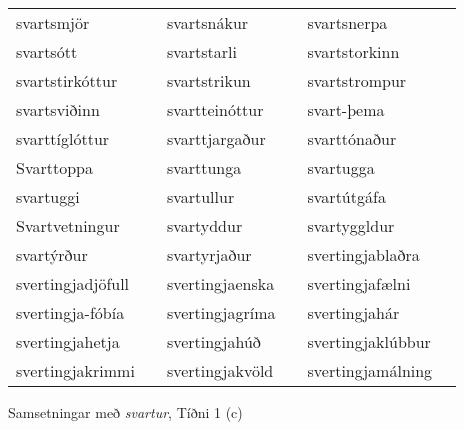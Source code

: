 \documentclass[../samsetningasafn.tex]{subfiles}
\begin{document}
\begin{wordlist}[H]
\begin{tcolorbox}
\begin{tabular}{BlBlBl}
		svartsmjör	&		& 
		svartsnákur	&		& 
		svartsnerpa	&		\\  %
		svartsótt		&		& 
		svartstarli		&		& 
		svartstorkinn	&		\\  %
		svartstirkóttur	&		& 
		svartstrikun	&		& 
		svartstrompur	&		\\  %
		svartsviðinn	&		& 
		svartteinóttur	&		& 
		svart-þema	&		\\  %
		svarttíglóttur	&		& 
		svarttjargaður	&		& 
		svarttónaður	&		\\  %
		Svarttoppa	& 		& 
		svarttunga	&		& 
		svartugga	&		\\  %
		svartuggi		& 		& 
		svartullur		&		& 
		svartútgáfa	&		\\  %
		Svartvetningur	&		& 
		svartyddur	&		& 
		svartyggldur	&		\\  %
		svartýrður	&		& 
		svartyrjaður	&		& 	
		svertingjablaðra & 		\\  %
		svertingjadjöfull &		& 
		svertingjaenska & 		& 
		svertingjafælni	 &		\\  %
		svertingja-fóbía & 		& 
		svertingjagríma & 		& 
		svertingjahár & 		\\  %
		svertingjahetja & 		& 
		svertingjahúð & 		& 
		svertingjaklúbbur & 	\\  %
		svertingjakrimmi & 		& 
		svertingjakvöld & 		& 
		svertingjamálning & 	  %
\end{tabular}
\end{tcolorbox}
	\caption{Samsetningar með \textit{svartur}, Tíðni 1 (c)}
	\label{listi:svart.1c}
\end{wordlist}	
	
\end{document}
